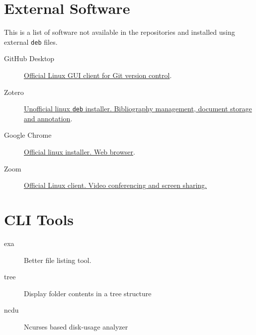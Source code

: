 \documentclass[8pt]{article}
\begin{document}
\section{External Software}

This is a list of software not available in the repositories and installed 
using external \texttt{deb} files.

\begin{description}
    \item[GitHub Desktop] \href{https://www.githubdesktop.com/github-desktop-linux-install/}{Official Linux GUI client for Git version control}.
    \item[Zotero] \href{https://github.com/retorquere/zotero-deb}{Unofficial linux \texttt{deb} installer. Bibliography management, document storage and annotation}.
    \item[Google Chrome] \href{https://www.google.com/chrome/?platform=linux}{Official linux installer. Web browser}.
    \item[Zoom]  \href{https://zoom.us/download?os=linux}{Official Linux client. Video conferencing and screen sharing.}
    \item[]  
\end{description}


\section{CLI Tools}

\begin{description}
    \item[exa] Better file listing tool. 
    \item[tree] Display folder contents in a tree structure
    \item[ncdu] Ncurses based disk-usage analyzer
\end{description}
\end{document}

